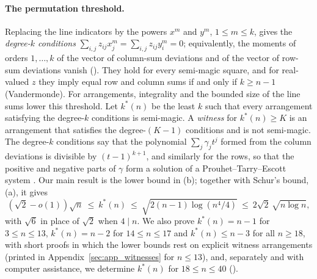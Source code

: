 \paragraph{The permutation threshold.}
Replacing the line indicators by the powers $x^m$ and $y^m$, $1\le m\le k$, gives the \emph{degree-$k$ conditions} $\sum_{i,j}z_{ij}x_j^m=\sum_{i,j}z_{ij}y_i^m=0$; equivalently, the moments of orders $1,\dots,k$ of the vector of column-sum deviations and of the vector of row-sum deviations vanish ().
They hold for every semi-magic square, and for real-valued $z$ they imply equal row and column sums if and only if $k\ge n-1$ (Vandermonde).
For arrangements, integrality and the bounded size of the line sums lower this threshold.
Let $k^*(n)$ be the least $k$ such that every arrangement satisfying the degree-$k$ conditions is semi-magic.
A \emph{witness} for $k^*(n)\ge K$ is an arrangement that satisfies the degree-$(K-1)$ conditions and is not semi-magic.
The degree-$k$ conditions say that the polynomial $\sum_j\gamma_jt^j$ formed from the column deviations is divisible by $(t-1)^{k+1}$, and similarly for the rows, so that the positive and negative parts of $\gamma$ form a solution of a Prouhet--Tarry--Escott system \cite{wright1959prouhet,borwein2002computational}.
Our main result is the lower bound in (b); together with Schur's bound, (a), it gives
\[
(\sqrt2-o(1))\sqrt n\ \le\ k^*(n)\ \le\ \sqrt{2(n-1)\log(n^4/4)}\ \le\ 2\sqrt2\,\sqrt{n\log n},
\]
with $\sqrt6$ in place of $\sqrt2$ when $4\mid n$.
We also prove $k^*(n)=n-1$ for $3\le n\le13$, $k^*(n)=n-2$ for $14\le n\le17$ and $k^*(n)\le n-3$ for all $n\ge18$, with short proofs in which the lower bounds rest on explicit witness arrangements (printed in Appendix~\ref{sec:app_witnesses} for $n\le13$), and, separately and with computer assistance, we determine $k^*(n)$ for $18\le n\le40$ ().

